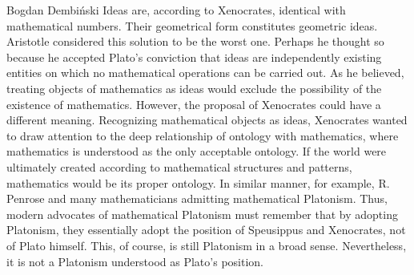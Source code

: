 \begin{artengenv}{Bogdan Dembiński}
Ideas are, according to Xenocrates, identical with mathematical numbers. Their geometrical form constitutes geometric
ideas. Aristotle considered this solution to be the worst one. Perhaps he thought so because he accepted Plato’s
conviction that ideas are independently existing entities on which no mathematical operations can be carried out. As he
believed, treating objects of mathematics as ideas would exclude the possibility of the existence of mathematics.%
However, the proposal of Xenocrates could have a different meaning. Recognizing mathematical objects as ideas,
Xenocrates wanted to draw attention to the deep relationship of ontology with mathematics, where mathematics is
understood as the only acceptable ontology. If the world were ultimately created according to mathematical structures
and patterns, mathematics would be its proper ontology. %
In similar manner, for example, R. Penrose and many mathematicians admitting mathematical Platonism. Thus, modern
advocates of mathematical Platonism must remember that by adopting Platonism, they essentially adopt the position of
Speusippus and Xenocrates, not of Plato himself. This, of course, is still Platonism in a broad sense. Nevertheless, it
is not a Platonism understood as Plato’s position.


\end{artengenv}
